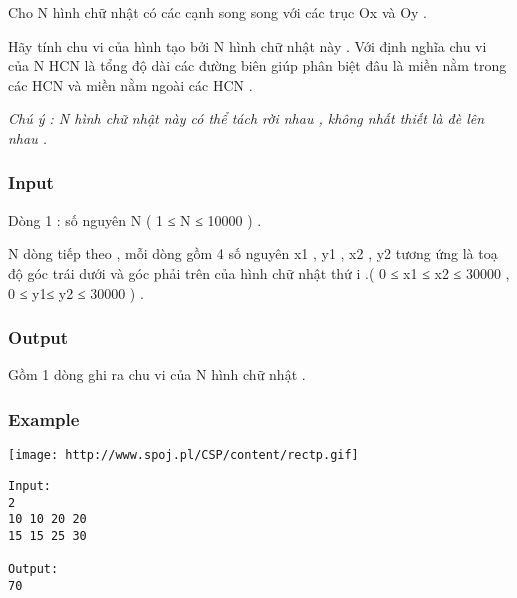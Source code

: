 



   Cho N hình chữ nhật có các cạnh song song với các trục Ox và Oy .   


   Hãy tính chu vi của hình tạo bởi N hình chữ nhật này . Với định nghĩa chu vi của N HCN là tổng độ dài các đường biên giúp phân biệt đâu là miền nằm trong các HCN và miền nằm ngoài các HCN .   


\textit{    Chú ý : N hình chữ nhật này có thể tách rời nhau , không nhất thiết là đè lên nhau .   }

\subsubsection{   Input  }

   Dòng 1 : số nguyên N ( 1 ≤ N ≤ 10000 ) .   


   N dòng tiếp theo , mỗi dòng gồm 4 số nguyên x1 , y1 , x2 , y2 tương ứng là toạ độ góc trái dưới và góc phải trên của hình chữ nhật thứ i .( 0 ≤ x1 ≤ x2 ≤ 30000 , 0 ≤ y1≤ y2 ≤ 30000 ) .  

\subsubsection{   Output  }

   Gồm 1 dòng ghi ra chu vi của N hình chữ nhật .  

\subsubsection{   Example  }
\texttt{[image: http://www.spoj.pl/CSP/content/rectp.gif]}
\begin{verbatim}
Input:
2
10 10 20 20
15 15 25 30

Output:
70
\end{verbatim}
